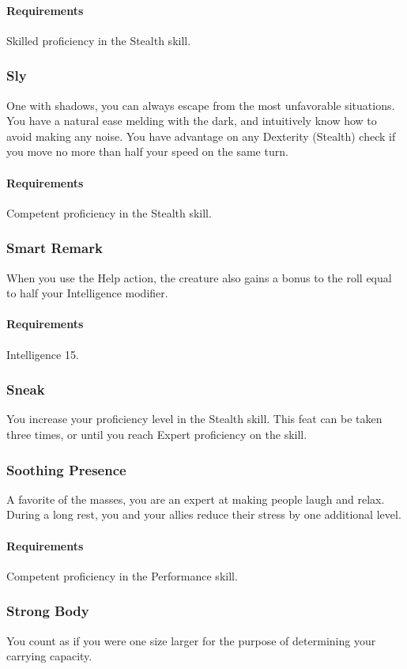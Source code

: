     \paragraph{Requirements} Skilled proficiency in the Stealth skill.
\subsubsection{Sly} \label{feat::sly}
    One with shadows, you can always escape from the most unfavorable situations.
    You have a natural ease melding with the dark, and intuitively know how to avoid making any noise.
    You have advantage on any Dexterity (Stealth) check if you move no more than half your speed on the same turn.
    \paragraph{Requirements} Competent proficiency in the Stealth skill.
\subsubsection{Smart Remark} \label{feat::smartremark}
    When you use the Help action, the creature also gains a bonus to the roll equal to half your Intelligence modifier.
    \paragraph{Requirements} Intelligence 15.
\subsubsection{Sneak} \label{feat::sneak}
    You increase your proficiency level in the Stealth skill.
    This feat can be taken three times, or until you reach Expert proficiency on the skill.
\subsubsection{Soothing Presence} \label{feat::soothingpresence}
    A favorite of the masses, you are an expert at making people laugh and relax.
    During a long rest, you and your allies reduce their stress by one additional level.
    \paragraph{Requirements} Competent proficiency in the Performance skill.
\subsubsection{Strong Body} \label{feat::strongbody}
    You count as if you were one size larger for the purpose of determining your carrying capacity.

